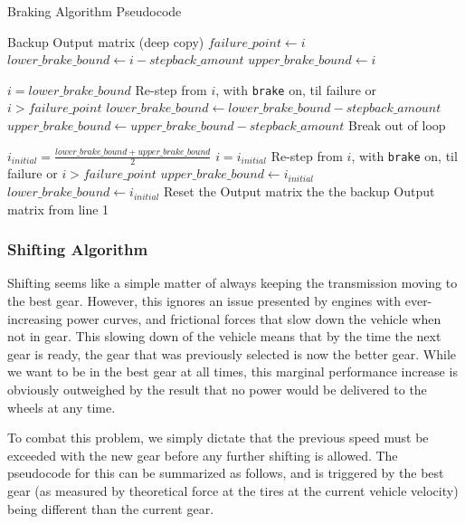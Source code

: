 \documentclass{article}
\begin{document}
\begin{algorithm}[H]
\caption{Braking Algorithm Pseudocode}
\begin{algorithmic}[1]
	\State Backup Output matrix (deep copy)
	\State $failure\_point \gets i$
	\State $lower\_brake\_bound \gets i-stepback\_amount$
	\State $upper\_brake\_bound \gets i$
	
		\State $i = lower\_brake\_bound$
		\State Re-step from $i$, with \texttt{brake} on, til failure or $i > failure\_point$
			\State $lower\_brake\_bound \gets lower\_brake\_bound - stepback\_amount$
			\State $upper\_brake\_bound \gets upper\_brake\_bound - stepback\_amount$
		\Else
			\State Break out of loop
		\EndIf
	\EndWhile
	
		\State $i_{initial} = \frac{lower\_brake\_bound + upper\_brake\_bound}{2}$
		\State $i = i_{initial}$
		\State Re-step from $i$, with \texttt{brake} on, til failure or $i > failure\_point$
			\State $upper\_brake\_bound \gets i_{initial}$
		\Else
			\State $lower\_brake\_bound \gets i_{initial}$
		\EndIf
		\State Reset the Output matrix the the backup Output matrix from line 1
	\EndWhile
	
\end{algorithmic}
\end{algorithm}

\subsubsection{Shifting Algorithm}

Shifting seems like a simple matter of always keeping the transmission moving to the best gear. However, this ignores an issue presented by engines with ever-increasing power curves, and frictional forces that slow down the vehicle when not in gear. This slowing down of the vehicle means that by the time the next gear is ready, the gear that was previously selected is now the better gear. While we want to be in the best gear at all times, this marginal performance increase is obviously outweighed by the result that no power would be delivered to the wheels at any time.

To combat this problem, we simply dictate that the previous speed must be exceeded with the new gear before any further shifting is allowed. The pseudocode for this can be summarized as follows, and is triggered by the best gear (as measured by theoretical force at the tires at the current vehicle velocity) being different than the current gear.
\end{document}
